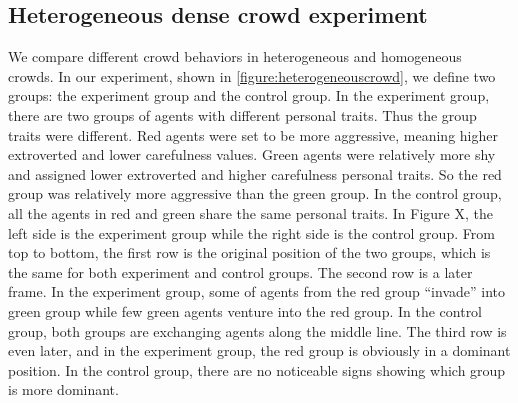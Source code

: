 \documentclass[conference]{acmsiggraph}
\begin{document}
\subsection{Heterogeneous dense crowd experiment}
\label{section:6.2}
We compare different crowd behaviors in heterogeneous and homogeneous crowds. In our experiment, shown in \ref{figure:heterogeneouscrowd}, we define two groups: the experiment group and the control group. In the experiment group, there are two groups of agents with different personal traits. Thus the group traits were different. Red agents were set to be more aggressive, meaning higher extroverted and lower carefulness values. Green agents were relatively more shy and assigned lower extroverted and higher carefulness personal traits. So the red group was relatively more aggressive than the green group. In the control group, all the agents in red and green share the same personal traits. In Figure X, the left side is the experiment group while the right side is the control group. From top to bottom, the first row is the original position of the two groups, which is the same for both experiment and control groups. The second row is a later frame. In the experiment group, some of agents from the red group “invade” into green group while few green agents venture into the red group. In the control group, both groups are exchanging agents along the middle line. The third row is even later, and in the experiment group, the red group is obviously in a dominant position. In the control group, there are no noticeable signs showing which group is more dominant.
\end{document}
